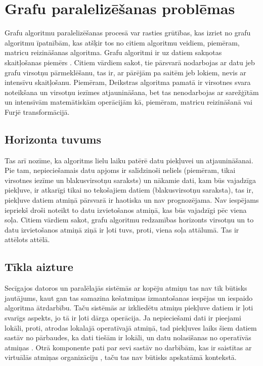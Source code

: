 \section{Grafu paralelizēšanas problēmas}
Grafu algoritmu paralelizēšanas procesā var rasties grūtības, kas izriet no grafu algoritmu
īpatnībām, kas atšķir tos no citiem algoritmu veidiem, piemēram, matricu reizināšanas algoritma.
Grafu algoritmi ir uz datiem sakņotas skaitļošanas piemērs
\cite{GraphTheory,HandbookOfGraphTheory,Zettaflops}. Citiem vārdiem sakot,
tie pārsvarā nodarbojas ar datu jeb grafu virsotņu pārmeklēšanu, tas ir, ar pārējām pa saitēm
jeb lokiem, nevis ar intensīvu skaitļošanu. Piemēram, Deikstras algoritma pamatā ir virsotnes
svara noteikšana un virsotņu iezīmes atjaunināšana, bet tas nenodarbojas ar sarežģītām un
intensīvām matemātiskām operācijām kā, piemēram, matricu reizināšanā vai Furjē transformācijā.

\subsection{Horizonta tuvums}
Tas arī nozīme, ka algoritms lielu laiku patērē datu piekļuvei un atjaunināšanai. Pie tam,
nepieciešamais datu apjoms ir salīdzinoši neliels (piemēram, tikai virsotnes iezīme un
blakusvirsotņu saraksts) un nākamie dati, kam būs vajadzīga piekļuve, ir atkarīgi tikai no
tekošajiem datiem (blakusvirsotņu saraksta), tas ir, piekļuve datiem atmiņā pārsvarā ir haotiska
un nav prognozējama. Nav iespējams iepriekš droši noteikt to datu izvietošanos atmiņā,
kas būs vajadzīgi pēc viena soļa. Citiem vārdiem sakot, grafu algoritmu redzamības
horizonts virsotņu un to datu izvietošanos atmiņā ziņā ir ļoti tuvs, proti, viena
soļa attālumā. Tas ir attēlots  attēlā.


\subsection{Tīkla aizture}
Secīgajos datoros un paralēlajās sistēmās ar kopēju atmiņu tas nav tik būtisks
jautājums, kaut gan tas samazina kešatmiņas izmantošanas iespējas un iespaido algoritma ātrdarbību.
Taču sistēmās ar izkliedētu atmiņu piekļuve datiem ir ļoti svarīgs aspekts, jo tā ir ļoti
dārga operācija. Ja nepieciešami dati ir pieejami lokāli, proti, atrodas lokalajā
operatīvajā atmiņā, tad piekļuves laiks šiem datiem sastāv no pārbaudes, ka dati
tiešām ir lokāli, un datu nolasīšanas no operatīvās atmiņas .
Otrā komponente pati par sevi sastāv no darbībām, kas ir saistītas ar virtuālās
atmiņas organizāciju \cite{OSC}, taču tas nav būtisks apskatāmā kontekstā.

